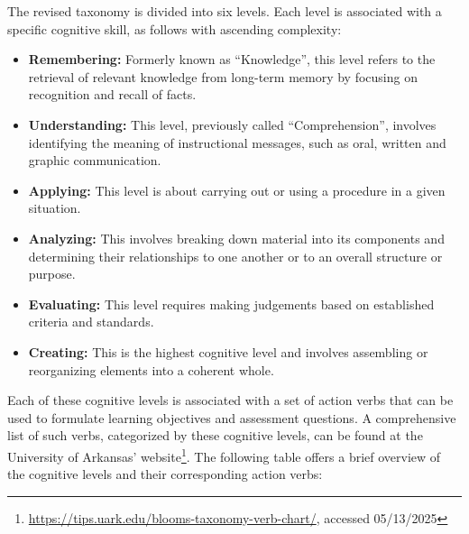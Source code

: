 The revised taxonomy \cite{krathwohl_revision_2002} is divided into six levels. Each level is associated with a specific cognitive skill, as follows with ascending complexity:

\begin{itemize}
   \item \textbf{Remembering:} Formerly known as \enquote{Knowledge}, this level refers to the retrieval of relevant knowledge from long-term memory by focusing on recognition and recall of facts.
   \item \textbf{Understanding:} This level, previously called \enquote{Comprehension}, involves identifying the meaning of instructional messages, such as oral, written and graphic communication.
   \item \textbf{Applying:} This level is about carrying out or using a procedure in a given situation.
   \item \textbf{Analyzing:} This involves breaking down material into its components and determining their relationships to one another or to an overall structure or purpose.
   \item \textbf{Evaluating:} This level requires making judgements based on established criteria and standards.
   \item \textbf{Creating:} This is the highest cognitive level and involves assembling or reorganizing elements into a coherent whole.
\end{itemize}

Each of these cognitive levels is associated with a set of action verbs that can be used to formulate learning objectives and assessment questions. A comprehensive list of such verbs, categorized by these cognitive levels, can be found at the University of Arkansas' website\footnote{\url{https://tips.uark.edu/blooms-taxonomy-verb-chart/}, accessed 05/13/2025}. The following table offers a brief overview of the cognitive levels and their corresponding action verbs:

\pagebreak

